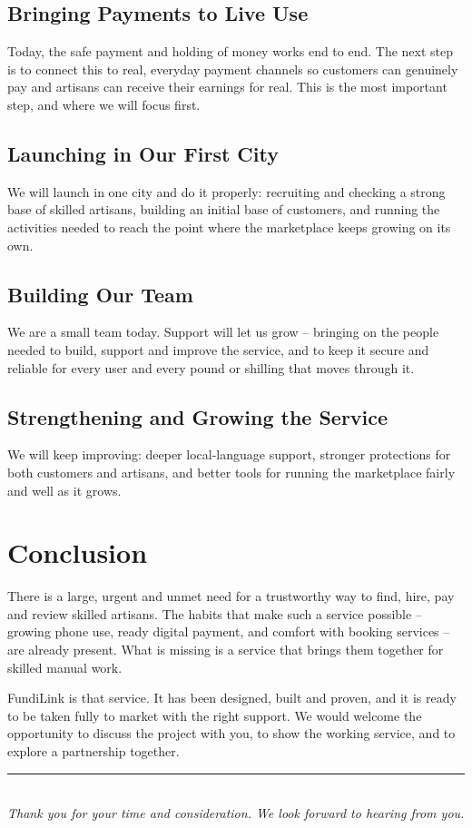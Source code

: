 \documentclass[11pt,a4paper]{article}
\begin{document}
\subsection{Bringing Payments to Live Use}

Today, the safe payment and holding of money works end to end. The next step is to connect
this to real, everyday payment channels so customers can genuinely pay and artisans can
receive their earnings for real. This is the most important step, and where we will focus
first.

\subsection{Launching in Our First City}

We will launch in one city and do it properly: recruiting and checking a strong base of
skilled artisans, building an initial base of customers, and running the activities needed to
reach the point where the marketplace keeps growing on its own.

\subsection{Building Our Team}

We are a small team today. Support will let us grow -- bringing on the people needed to build,
support and improve the service, and to keep it secure and reliable for every user and every
pound or shilling that moves through it.

\subsection{Strengthening and Growing the Service}

We will keep improving: deeper local-language support, stronger protections for both customers
and artisans, and better tools for running the marketplace fairly and well as it grows.

\section{Conclusion}

There is a large, urgent and unmet need for a trustworthy way to find, hire, pay and review
skilled artisans. The habits that make such a service possible -- growing phone use, ready
digital payment, and comfort with booking services -- are already present. What is missing is
a service that brings them together for skilled manual work.

FundiLink is that service. It has been designed, built and proven, and it is ready to be taken
fully to market with the right support. We would welcome the opportunity to discuss the
project with you, to show the working service, and to explore a partnership together.

\vspace{1em}
\begin{center}
\small
\rule{0.4\textwidth}{0.4pt}\\[0.6em]
\textit{Thank you for your time and consideration. We look forward to hearing from you.}
\end{center}
\end{document}
